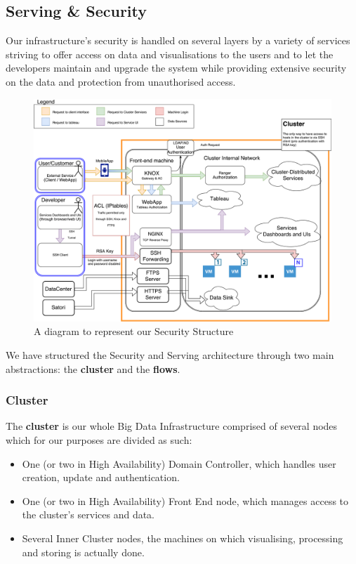 \subsection{Serving \& Security}
Our infrastructure's security is handled on several layers by a variety of services striving to offer access on data and visualisations to the users and to let the developers maintain and upgrade the system while providing extensive security on the data and protection from unauthorised access.

\begin{figure}[h]
	\centering
	\includegraphics[scale=0.4]{Figures/SecurityStructureDiagram}
	\decoRule
	\caption[Security Structure Diagram]{A diagram to represent our Security Structure}
	\label{fig:SecurityStructureDiagram}
\end{figure}

We have structured the Security and Serving architecture through two main abstractions: the \textbf{cluster} and the \textbf{flows}.
\subsubsection{Cluster}
The \textbf{cluster} is our whole Big Data Infrastructure comprised of several nodes which for our purposes are divided as such:
\begin{itemize}
	\item One (or two in High Availability) Domain Controller, which handles user creation, update and authentication.
	\item One (or two in High Availability) Front End node, which manages access to the cluster's services and data.
	\item Several Inner Cluster nodes, the machines on which visualising, processing and storing is actually done.
\end{itemize}

